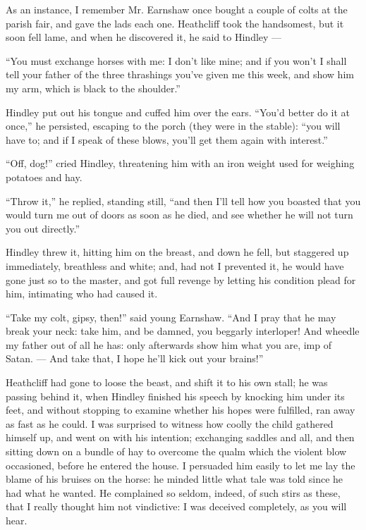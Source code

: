 \par As an instance, I remember Mr. Earnshaw once bought a couple of colts at the parish fair, and gave the lads each one. Heathcliff took the handsomest, but it soon fell lame, and when he discovered it, he said to Hindley —
\par “You must exchange horses with me: I don't like mine; and if you won't I shall tell your father of the three thrashings you've given me this week, and show him my arm, which is black to the shoulder.”
\par Hindley put out his tongue and cuffed him over the ears. “You'd better do it at once,” he persisted, escaping to the porch (they were in the stable): “you will have to; and if I speak of these blows, you'll get them again with interest.”
\par “Off, dog!” cried Hindley, threatening him with an iron weight used for weighing potatoes and hay.
\par “Throw it,” he replied, standing still, “and then I'll tell how you boasted that you would turn me out of doors as soon as he died, and see whether he will not turn you out directly.”
\par Hindley threw it, hitting him on the breast, and down he fell, but staggered up immediately, breathless and white; and, had not I prevented it, he would have gone just so to the master, and got full revenge by letting his condition plead for him, intimating who had caused it.
\par “Take my colt, gipsy, then!” said young Earnshaw. “And I pray that he may break your neck: take him, and be damned, you beggarly interloper! And wheedle my father out of all he has: only afterwards show him what you are, imp of Satan. — And take that, I hope he'll kick out your brains!”
\par Heathcliff had gone to loose the beast, and shift it to his own stall; he was passing behind it, when Hindley finished his speech by knocking him under its feet, and without stopping  to examine whether his hopes were fulfilled, ran away as fast as he could. I was surprised to witness how coolly the child gathered himself up, and went on with his intention; exchanging saddles and all, and then sitting down on a bundle of hay to overcome the qualm which the violent blow occasioned, before he entered the house. I persuaded him easily to let me lay the blame of his bruises on the horse: he minded little what tale was told since he had what he wanted. He complained so seldom, indeed, of such stirs as these, that I really thought him not vindictive: I was deceived completely, as you will hear.


